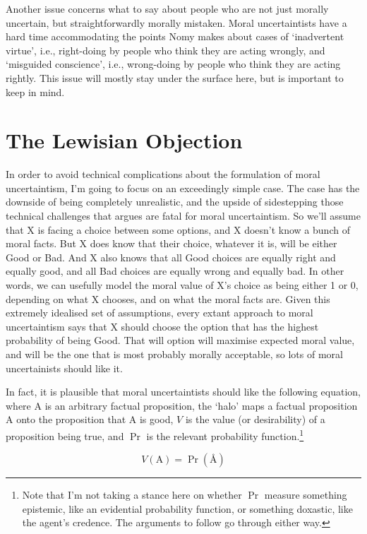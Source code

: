 Another issue concerns what to say about people who are not just morally uncertain, but straightforwardly morally mistaken. Moral uncertaintists have a hard time accommodating the points Nomy \citet{Arpaly200x} makes about cases of `inadvertent virtue', i.e., right-doing by people who think they are acting wrongly, and `misguided conscience', i.e., wrong-doing by people who think they are acting rightly. This issue will mostly stay under the surface here, but is important to keep in mind.

\section{The Lewisian Objection}
\label{thelewisianobjection}

In order to avoid technical complications about the formulation of moral uncertaintism, I'm going to focus on an exceedingly simple case. The case has the downside of being completely unrealistic, and the upside of sidestepping those technical challenges that \citet{Hedden201x} argues are fatal for moral uncertaintism. So we'll assume that X is facing a choice between some options, and X doesn't know a bunch of moral facts. But X does know that their choice, whatever it is, will be either Good or Bad. And X also knows that all Good choices are equally right and equally good, and all Bad choices are equally wrong and equally bad. In other words, we can usefully model the moral value of X's choice as being either 1 or 0, depending on what X chooses, and on what the moral facts are. Given this extremely idealised set of assumptions, every extant approach to moral uncertaintism says that X should choose the option that has the highest probability of being Good. That will option will maximise expected moral value, and will be the one that is most probably morally acceptable, so lots of moral uncertainists should like it.

In fact, it is plausible that moral uncertaintists should like the following equation, where A is an arbitrary factual proposition, the `halo' maps a factual proposition A onto the proposition that A is good, $V$ is the value (or desirability) of a proposition being true, and $\Pr$ is the relevant probability function.\footnote{Note that I'm not taking a stance here on whether $\Pr$ measure something epistemic, like an evidential probability function, or something doxastic, like the agent's credence. The arguments to follow go through either way.}

$$V(\text{A}) = \Pr(\text{Å})$$

